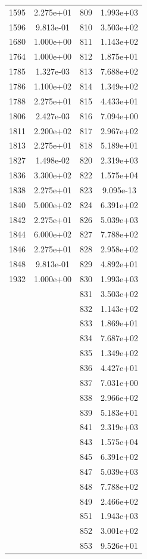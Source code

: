 \documentclass[12pt]{article}
\begin{document}
\begin{longtable}{@{}cccc@{}}
1595 & 2.275e+01 & 809 & 1.993e+03 \\
1596 & 9.813e-01 & 810 & 3.503e+02 \\
1680 & 1.000e+00 & 811 & 1.143e+02 \\
1764 & 1.000e+00 & 812 & 1.875e+01 \\
1785 & 1.327e-03 & 813 & 7.688e+02 \\
1786 & 1.100e+02 & 814 & 1.349e+02 \\
1788 & 2.275e+01 & 815 & 4.433e+01 \\
1806 & 2.427e-03 & 816 & 7.094e+00 \\
1811 & 2.200e+02 & 817 & 2.967e+02 \\
1813 & 2.275e+01 & 818 & 5.189e+01 \\
1827 & 1.498e-02 & 820 & 2.319e+03 \\
1836 & 3.300e+02 & 822 & 1.575e+04 \\
1838 & 2.275e+01 & 823 & 9.095e-13 \\
1840 & 5.000e+02 & 824 & 6.391e+02 \\
1842 & 2.275e+01 & 826 & 5.039e+03 \\
1844 & 6.000e+02 & 827 & 7.788e+02 \\
1846 & 2.275e+01 & 828 & 2.958e+02 \\
1848 & 9.813e-01 & 829 & 4.892e+01 \\
1932 & 1.000e+00 & 830 & 1.993e+03 \\
 &  & 831 & 3.503e+02 \\
 &  & 832 & 1.143e+02 \\
 &  & 833 & 1.869e+01 \\
 &  & 834 & 7.687e+02 \\
 &  & 835 & 1.349e+02 \\
 &  & 836 & 4.427e+01 \\
 &  & 837 & 7.031e+00 \\
 &  & 838 & 2.966e+02 \\
 &  & 839 & 5.183e+01 \\
 &  & 841 & 2.319e+03 \\
 &  & 843 & 1.575e+04 \\
 &  & 845 & 6.391e+02 \\
 &  & 847 & 5.039e+03 \\
 &  & 848 & 7.788e+02 \\
 &  & 849 & 2.466e+02 \\
 &  & 851 & 1.943e+03 \\
 &  & 852 & 3.001e+02 \\
 &  & 853 & 9.526e+01 \\

\end{longtable}
\end{document}
